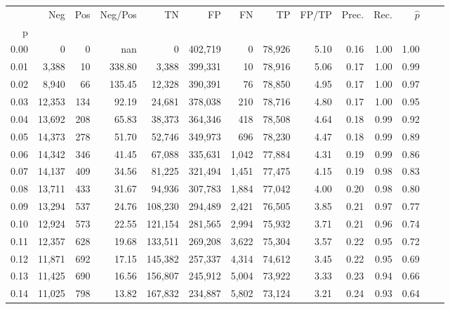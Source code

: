 \begin{tabular}{rrrrrrrrrrrrrr}
\toprule
{} &     Neg &    Pos & Neg/Pos &       TN &       FP &      FN &      TP & FP/TP & Prec. &  Rec. & $\hat{p}$ \\
p    &         &        &         &          &          &         &         &       &       &       &           \\
\midrule
0.00 &       0 &      0 &     nan &        0 &  402,719 &       0 &  78,926 &  5.10 &  0.16 &  1.00 &      1.00 \\
0.01 &   3,388 &     10 &  338.80 &    3,388 &  399,331 &      10 &  78,916 &  5.06 &  0.17 &  1.00 &      0.99 \\
0.02 &   8,940 &     66 &  135.45 &   12,328 &  390,391 &      76 &  78,850 &  4.95 &  0.17 &  1.00 &      0.97 \\
0.03 &  12,353 &    134 &   92.19 &   24,681 &  378,038 &     210 &  78,716 &  4.80 &  0.17 &  1.00 &      0.95 \\
0.04 &  13,692 &    208 &   65.83 &   38,373 &  364,346 &     418 &  78,508 &  4.64 &  0.18 &  0.99 &      0.92 \\
0.05 &  14,373 &    278 &   51.70 &   52,746 &  349,973 &     696 &  78,230 &  4.47 &  0.18 &  0.99 &      0.89 \\
0.06 &  14,342 &    346 &   41.45 &   67,088 &  335,631 &   1,042 &  77,884 &  4.31 &  0.19 &  0.99 &      0.86 \\
0.07 &  14,137 &    409 &   34.56 &   81,225 &  321,494 &   1,451 &  77,475 &  4.15 &  0.19 &  0.98 &      0.83 \\
0.08 &  13,711 &    433 &   31.67 &   94,936 &  307,783 &   1,884 &  77,042 &  4.00 &  0.20 &  0.98 &      0.80 \\
0.09 &  13,294 &    537 &   24.76 &  108,230 &  294,489 &   2,421 &  76,505 &  3.85 &  0.21 &  0.97 &      0.77 \\
0.10 &  12,924 &    573 &   22.55 &  121,154 &  281,565 &   2,994 &  75,932 &  3.71 &  0.21 &  0.96 &      0.74 \\
0.11 &  12,357 &    628 &   19.68 &  133,511 &  269,208 &   3,622 &  75,304 &  3.57 &  0.22 &  0.95 &      0.72 \\
0.12 &  11,871 &    692 &   17.15 &  145,382 &  257,337 &   4,314 &  74,612 &  3.45 &  0.22 &  0.95 &      0.69 \\
0.13 &  11,425 &    690 &   16.56 &  156,807 &  245,912 &   5,004 &  73,922 &  3.33 &  0.23 &  0.94 &      0.66 \\
0.14 &  11,025 &    798 &   13.82 &  167,832 &  234,887 &   5,802 &  73,124 &  3.21 &  0.24 &  0.93 &      0.64 \\

\end{tabular}
